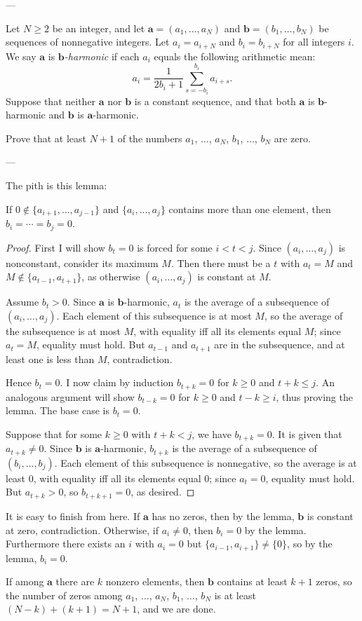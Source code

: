 
---

Let $N\ge2$ be an integer, and let $\mathbf a=(a_1,\ldots,a_N)$ and $\mathbf b=(b_1,\ldots,b_N)$ be sequences of nonnegative integers. Let $a_i=a_{i+N}$ and $b_i=b_{i+N}$ for all integers $i$. We say $\mathbf a$ is \emph{$\mathbf b$-harmonic} if each $a_i$ equals the following arithmetic mean: \[a_i=\frac1{2b_i+1}\sum_{s=-b_i}^{b_i}a_{i+s}.\]
Suppose that neither $\mathbf a$ nor $\mathbf b$ is a constant sequence, and that both $\mathbf a$ is $\mathbf b$-harmonic and $\mathbf b$ is $\mathbf a$-harmonic.

Prove that at least $N+1$ of the numbers $a_1$, $\ldots$, $a_N$, $b_1$, $\ldots$, $b_N$ are zero.

---

The pith is this lemma:
\begin{boxlemma*}
    If $0\notin\{a_{i+1},\ldots,a_{j-1}\}$ and $\{a_i,\ldots,a_j\}$ contains more than one element, then $b_i=\cdots=b_j=0$.
\end{boxlemma*}
\begin{proof}
    First I will show $b_t=0$ is forced for some $i<t<j$. Since $(a_i,\ldots,a_j)$ is nonconstant, consider its maximum $M$. Then there must be a $t$ with $a_t=M$ and $M\notin\{a_{t-1},a_{t+1}\}$, as otherwise $(a_i,\ldots,a_j)$ is constant at $M$.

    Assume $b_t>0$. Since $\mathbf a$ is $\mathbf b$-harmonic, $a_t$ is the average of a subsequence of $(a_i,\ldots,a_j)$. Each element of this subsequence is at most $M$, so the average of the subsequence is at most $M$, with equality iff all its elements equal $M$; since $a_t=M$, equality must hold. But $a_{t-1}$ and $a_{t+1}$ are in the subsequence, and at least one is less than $M$, contradiction.

    Hence $b_t=0$. I now claim by induction $b_{t+k}=0$ for $k\ge0$ and $t+k\le j$. An analogous argument will show $b_{t-k}=0$ for $k\ge0$ and $t-k\ge i$, thus proving the lemma. The base case is $b_t=0$.

    Suppose that for some $k\ge0$ with $t+k<j$, we have $b_{t+k}=0$. It is given that $a_{t+k}\ne0$. Since $\mathbf b$ is $\mathbf a$-harmonic, $b_{t+k}$ is the average of a subsequence of $(b_i,\ldots,b_j)$. Each element of this subsequence is nonnegative, so the average is at least $0$, with equality iff all its elements equal $0$; since $a_t=0$, equality must hold. But $a_{t+k}>0$, so $b_{t+k+1}=0$, as desired.
\end{proof}

It is easy to finish from here. If $\mathbf a$ has no zeros, then by the lemma, $\mathbf b$ is constant at zero, contradiction. Otherwise, if $a_i\ne0$, then $b_i=0$ by the lemma. Furthermore there exists an $i$ with $a_i=0$ but $\{a_{i-1},a_{i+1}\}\ne\{0\}$, so by the lemma, $b_i=0$.

If among $\mathbf a$ there are $k$ nonzero elements, then $\mathbf b$ contains at least $k+1$ zeros, so the number of zeros among $a_1$, $\ldots$, $a_N$, $b_1$, $\ldots$, $b_N$ is at least $(N-k)+(k+1)=N+1$, and we are done.

